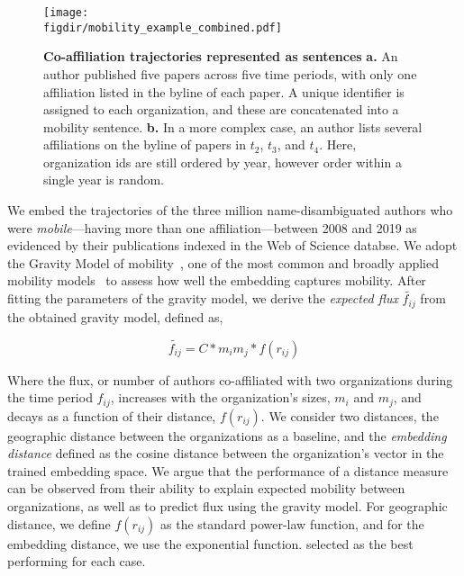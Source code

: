 \documentclass[12pt]{article} %
\def\figdir{../Figs}
\begin{document}
%
%
\begin{figure}[ht!]
    \centering
    \texttt{[image: \\figdir/mobility\_example\_combined.pdf]}
    \caption{
        \textbf{Co-affiliation trajectories represented as sentences}
        \textbf{a.} 
        An author published five papers across five time periods, with only one affiliation listed in the byline of each paper. 
        A unique identifier is assigned to each organization, and these are concatenated into a mobility sentence. 
        \textbf{b.}
        In a more complex case, an author lists several affiliations on the byline of papers in $t_{2}$, $t_{3}$, and $t_{4}$. Here, organization ids are still ordered by year, however order within a single year is random.      
    }
    \label{fig:methods:mobility_sentence}
\end{figure}


We embed the trajectories of the three million name-disambiguated authors who were \textit{mobile}---having more than one affiliation---between 2008 and 2019 as evidenced by their publications indexed in the Web of Science databse. 
We adopt the Gravity Model of mobility~\autocite{zipf1946gravity}, one of the most common and broadly applied mobility models~\autocite{curiel2018citygravity, lewer2008immigrationgravity, jung2008highwaygravity, hong2016busgravity, truscott2012epidemicgravity, xia2005measlesgravity} to assess how well the embedding captures mobility. After fitting the parameters of the gravity model, we derive the \textit{expected flux} $\widetilde{f_{ij}}$ from the obtained gravity model, defined as,

\begin{equation}
	\label{eq:gravity_basic}
	\widetilde{f_{ij}} = C*m_{i}m_{j}*f(r_{ij})
\end{equation}

Where the flux, or number of authors co-affiliated with two organizations during the time period $f_{ij}$, increases with the organization's sizes, $m_{i}$ and $m_{j}$, and decays as a function of their distance, $f(r_{ij})$. 
We consider two distances, the geographic distance between the organizations as a baseline, and the \textit{embedding distance} defined as the cosine distance between the organization's vector in the trained embedding space. 
We argue that the performance of a distance measure can be observed from their ability to explain expected mobility between organizations, as well as to predict flux using the gravity model. 
For geographic distance, we define $f(r_{ij})$ as the standard power-law function, and for the embedding distance, we use the exponential function. selected as the best performing for each case. 
\end{document}
